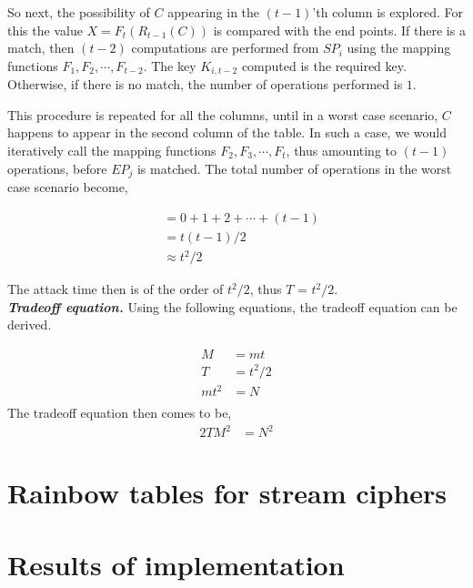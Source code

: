 So next, the possibility of $C$ appearing in the $(t-1)$'th column is explored. For this the value $X = F_{t}(R_{t-1}(C))$ is compared with the end points. If there is a match, then $(t-2)$ computations are performed from $SP_{i}$ using the mapping functions $F_1, F_2, \cdots, F_{t-2}$. The key $K_{i,t-2}$ computed is the required key. Otherwise, if there is no match, the number of operations performed is $1$.

This procedure is repeated for all the columns, until in a worst case scenario, $C$ happens to appear in the second column of the table. In such a case, we would iteratively call the mapping functions $F_2, F_3, \cdots, F_t$, thus amounting to $(t-1)$ operations, before $EP_j$ is matched. The total number of operations in the worst case scenario become, 

\begin{align*}
&= 0 + 1 + 2 + \cdots + (t-1)\\
&= t(t-1)/2\\
&\approx t^2/2
\end{align*}

The attack time then is of the order of $t^2/2$, thus $T$ = $t^2/2$.\\


\noindent \textit{\textbf{Tradeoff equation.}} Using the following equations, the tradeoff equation can be derived. 

\begin{align*}
M &= mt\\
T &= t^2/2\\
mt^2 &= N\\
\end{align*}
The tradeoff equation then comes to be,
\begin{align}
\label{eq:tmdto-rainbow-block} 2TM^2 &= N^2
\end{align}


\section{Rainbow tables for stream ciphers}
\label{sec:rainbow-stream}


\section{Results of implementation}
\label{sec:rainbow-impl}